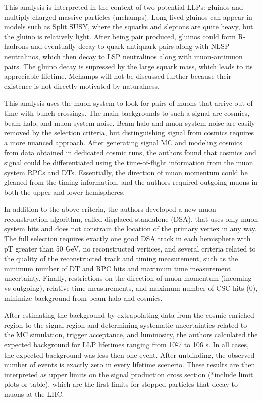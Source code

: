 \documentclass[12pt]{article}
\begin{document}
            This analysis is interpreted in the context of two potential LLPs: gluinos and multiply charged massive particles (mchamps). Long-lived gluinos can appear in models such as Split SUSY, where the squarks and sleptons are quite heavy, but the gluino is relatively light. After being pair produced, gluinos could form R-hadrons and eventually decay to quark-antiquark pairs along with NLSP neutralinos, which then decay to LSP neutralinos along with muon-antimuon pairs. The gluino decay is supressed by the large squark mass, which leads to its appreciable lifetime. Mchamps will not be discussed further because their existence is not directly motivated by naturalness.

            This analysis uses the muon system to look for pairs of muons that arrive out of time with bunch crossings. The main backgrounds to such a signal are cosmics, beam halo, and muon system noise. Beam halo and muon system noise are easily removed by the selection criteria, but distinguishing signal from cosmics requires a more nuanced approach. After generating signal MC and modeling cosmics from data obtained in dedicated cosmic runs, the authors found that cosmics and signal could be differentiated using the time-of-flight information from the muon system RPCs and DTs. Essentially, the direction of muon momentum could be gleaned from the timing information, and the authors required outgoing muons in both the upper and lower hemispheres.
            
            In addition to the above criteria, the authors developed a new muon reconstruction algorithm, called displaced standalone (DSA), that uses only muon system hits and does not constrain the location of the primary vertex in any way. The full selection requires exactly one good DSA track in each hemisphere with pT greater than 50 GeV, no reconstructed vertices, and several criteria related to the quality of the reconstructed track and timing measurement, such as the minimum number of DT and RPC hits and maximum time measurement uncertainty. Finally, restrictions on the direction of muon momentum (incoming vs outgoing), relative time measurements, and maximum number of CSC hits (0), minimize background from beam halo and cosmics.

            After estimating the background by extrapolating data from the cosmic-enriched region to the signal region and determining systematic uncertainties related to the MC simulation, trigger acceptance, and luminosity, the authors calculated the expected background for LLP lifetimes ranging from 10\^-7 to 10\^6 s. In all cases, the expected background was less then one event. After unblinding, the observed number of events is exactly zero in every lifetime scenerio. These results are then interpreted as upper limits on the signal production cross section (*include limit plots or table), which are the first limits for stopped particles that decay to muons at the LHC.
\end{document}
